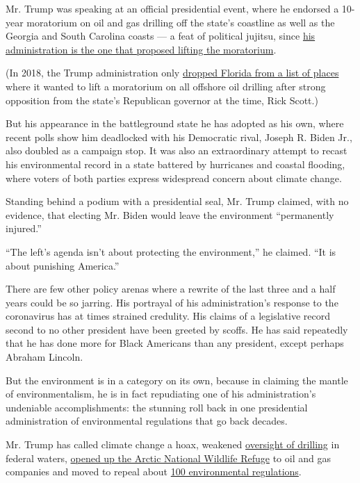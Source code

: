 Mr. Trump was speaking at an official presidential event, where he
endorsed a 10-year moratorium on oil and gas drilling off the state's
coastline as well as the Georgia and South Carolina coasts --- a feat of
political jujitsu, since
\href{https://www.nytimes3xbfgragh.onion/2018/01/04/climate/trump-offshore-drilling.html}{his
administration is the one that proposed lifting the moratorium}.

(In 2018, the Trump administration only
\href{https://www.nytimes3xbfgragh.onion/2018/01/09/climate/trump-florida-offshore-drilling.html}{dropped
Florida from a list of places} where it wanted to lift a moratorium on
all offshore oil drilling after strong opposition from the state's
Republican governor at the time, Rick Scott.)

But his appearance in the battleground state he has adopted as his own,
where recent polls show him deadlocked with his Democratic rival, Joseph
R. Biden Jr., also doubled as a campaign stop. It was also an
extraordinary attempt to recast his environmental record in a state
battered by hurricanes and coastal flooding, where voters of both
parties express widespread concern about climate change.

Standing behind a podium with a presidential seal, Mr. Trump claimed,
with no evidence, that electing Mr. Biden would leave the environment
``permanently injured.''

``The left's agenda isn't about protecting the environment,'' he
claimed. ``It is about punishing America.''

There are few other policy arenas where a rewrite of the last three and
a half years could be so jarring. His portrayal of his administration's
response to the coronavirus has at times strained credulity. His claims
of a legislative record second to no other president have been greeted
by scoffs. He has said repeatedly that he has done more for Black
Americans than any president, except perhaps Abraham Lincoln.

But the environment is in a category on its own, because in claiming the
mantle of environmentalism, he is in fact repudiating one of his
administration's undeniable accomplishments: the stunning roll back in
one presidential administration of environmental regulations that go
back decades.

Mr. Trump has called climate change a hoax, weakened
\href{https://www.nytimes3xbfgragh.onion/2019/05/02/climate/offshore-drilling-safety-rollback-deepwater-horizon.html}{oversight
of drilling} in federal waters,
\href{https://www.nytimes3xbfgragh.onion/2020/08/17/climate/alaska-oil-drilling-anwr.html}{opened
up the Arctic National Wildlife Refuge} to oil and gas companies and
moved to repeal about
\href{https://www.nytimes3xbfgragh.onion/interactive/2020/climate/trump-environment-rollbacks.html}{100
environmental regulations}.

